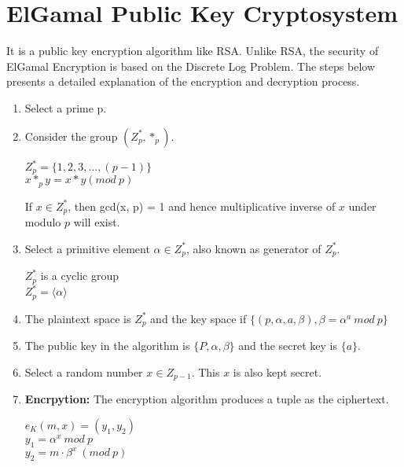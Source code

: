 \documentclass[11pt]{article}
\begin{document}
\section{ElGamal Public Key Cryptosystem}
It is a public key encryption algorithm like RSA. Unlike RSA, the security of ElGamal Encryption is based on the Discrete Log Problem. The steps below presents a detailed explanation of the encryption and decryption process.
\begin{enumerate}
    \item Select a prime p.
    \item Consider the group $(Z_p^*, *_p)$.
    \begin{center}
        $Z_p^* = \{1,2,3,\hdots,(p-1)\}$\\
        \vspace{1mm}
        $x *_p y = x * y (mod \ p)$\\
        \vspace{1mm}
    \end{center}
    If $x \in Z_p^*$, then gcd(x, p) = 1 and hence multiplicative inverse of $x$ under modulo $p$ will exist.
    \item Select a primitive element $\alpha \in Z_p^*$, also known as generator of $Z_p^*$.
    \begin{center}
        $Z_p^*$ is a cyclic group\\
        $Z_p^* = \langle \alpha \rangle$\\
    \end{center}

    \item The plaintext space is $Z_p^*$ and the key space if $\{(p, \alpha, a, \beta), \beta = \alpha^a \ mod \ p\}$
    \item The public key in the algorithm is $\{P, \alpha, \beta\}$ and the secret key is $\{a\}$.
    \item Select a random number $x \in Z_{p-1}$. This $x$ is also kept secret.
    \item \textbf{Encrpytion:} The encryption algorithm produces a tuple as the ciphertext. 
    \begin{center}
        $e_K(m, x) = (y_1, y_2)$\\
        \vspace{1mm}
        $y_1 = \alpha^x \ mod \ p$\\
        \vspace{1mm}
        $y_2 = m \cdot \beta^x \ (mod \ p)$
    \end{center}


\end{enumerate}
\end{document}
